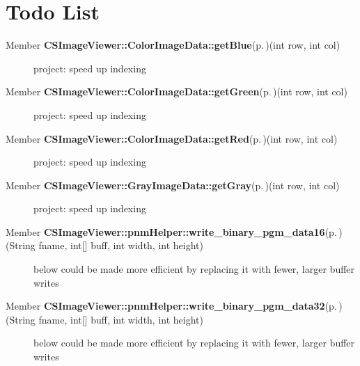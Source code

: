 \section{Todo List}\label{todo}
\label{todo__todo000003}
 \begin{description}
\item[Member {\bf CSImage\-Viewer::Color\-Image\-Data::get\-Blue}{\rm (p.\,\pageref{class_c_s_image_viewer_1_1_color_image_data_2d270d661f5cfa7d4be1e66701b55376})}(int row, int col) ]project: speed up indexing \end{description}


\label{todo__todo000002}
 \begin{description}
\item[Member {\bf CSImage\-Viewer::Color\-Image\-Data::get\-Green}{\rm (p.\,\pageref{class_c_s_image_viewer_1_1_color_image_data_eb04f53da669ba68d0ddd2dfc0ce9f9e})}(int row, int col) ]project: speed up indexing \end{description}


\label{todo__todo000001}
 \begin{description}
\item[Member {\bf CSImage\-Viewer::Color\-Image\-Data::get\-Red}{\rm (p.\,\pageref{class_c_s_image_viewer_1_1_color_image_data_3c7179eb0903415f89e40451632deca4})}(int row, int col) ]project: speed up indexing \end{description}


\label{todo__todo000004}
 \begin{description}
\item[Member {\bf CSImage\-Viewer::Gray\-Image\-Data::get\-Gray}{\rm (p.\,\pageref{class_c_s_image_viewer_1_1_gray_image_data_dcb7178c700e5ead72cd80cf91d05c2e})}(int row, int col) ]project: speed up indexing \end{description}


\label{todo__todo000006}
 \begin{description}
\item[Member {\bf CSImage\-Viewer::pnm\-Helper::write\_\-binary\_\-pgm\_\-data16}{\rm (p.\,\pageref{class_c_s_image_viewer_1_1pnm_helper_b9389279b59ecaff8492133a68a59b98})}(String fname, int\mbox{[}\mbox{]} buff, int width, int height) ]below could be made more efficient by replacing it with fewer, larger buffer writes \end{description}


\label{todo__todo000007}
 \begin{description}
\item[Member {\bf CSImage\-Viewer::pnm\-Helper::write\_\-binary\_\-pgm\_\-data32}{\rm (p.\,\pageref{class_c_s_image_viewer_1_1pnm_helper_37c7b83d8f17d8e3c8a8ecafe511d070})}(String fname, int\mbox{[}\mbox{]} buff, int width, int height) ]below could be made more efficient by replacing it with fewer, larger buffer writes \end{description}


